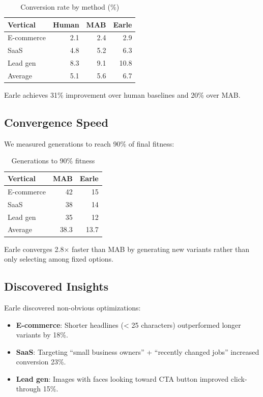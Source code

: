 \documentclass[11pt,twocolumn]{article}
\begin{document}
\begin{table}[h]
\centering
\caption{Conversion rate by method (\%)}
\label{tab:cvr}
\begin{tabular}{lrrr}
\hline
Vertical & Human & MAB & Earle \\
\hline
E-commerce & 2.1 & 2.4 & 2.9 \\
SaaS & 4.8 & 5.2 & 6.3 \\
Lead gen & 8.3 & 9.1 & 10.8 \\
\hline
Average & 5.1 & 5.6 & 6.7 \\
\hline
\end{tabular}
\end{table}

Earle achieves 31\% improvement over human baselines and 20\% over MAB.

\subsection{Convergence Speed}

We measured generations to reach 90\% of final fitness:

\begin{table}[h]
\centering
\caption{Generations to 90\% fitness}
\label{tab:convergence}
\begin{tabular}{lrr}
\hline
Vertical & MAB & Earle \\
\hline
E-commerce & 42 & 15 \\
SaaS & 38 & 14 \\
Lead gen & 35 & 12 \\
\hline
Average & 38.3 & 13.7 \\
\hline
\end{tabular}
\end{table}

Earle converges 2.8$\times$ faster than MAB by generating new variants rather than only selecting among fixed options.

\subsection{Discovered Insights}

Earle discovered non-obvious optimizations:

\begin{itemize}
\item \textbf{E-commerce}: Shorter headlines (< 25 characters) outperformed longer variants by 18\%.
\item \textbf{SaaS}: Targeting ``small business owners'' + ``recently changed jobs'' increased conversion 23\%.
\item \textbf{Lead gen}: Images with faces looking toward CTA button improved click-through 15\%.
\end{itemize}
\end{document}

